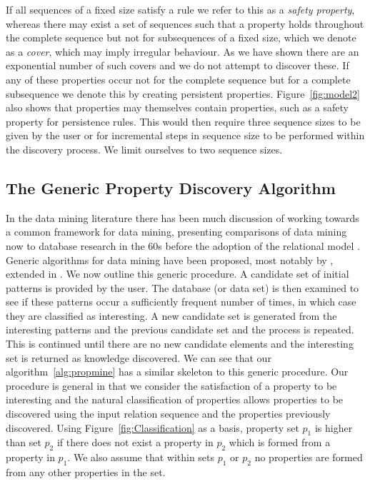 \medskip

If all sequences of a
fixed size satisfy a rule we refer to this as a {\em safety property},
whereas there may exist a set of sequences such that a property holds
throughout the complete sequence but not for subsequences of a fixed
size, which we denote as a {\em cover}, which may imply irregular
behaviour. As we have shown there are an exponential number of such
covers and we do not attempt to discover these. 
If any of these properties occur not for the complete sequence but for
a complete subsequence we
denote this by creating persistent 
properties. Figure~\ref{fig:model2} also shows that properties may themselves
contain properties, such as a safety property for persistence
rules. This would then require three sequence sizes to be given by the
user or for incremental steps in sequence size to be performed within
the discovery process. We limit ourselves to two sequence sizes.



\subsection{The Generic Property Discovery Algorithm}\label{subsec:tr_genalg}

In the data mining literature there has been much discussion of
working towards a common framework for data mining, presenting
comparisons of data mining now to database research in the 60s before
the adoption of the relational model \cite{fps96b,man96}. Generic algorithms for data
mining have been proposed, most notably by \cite{man96},
extended in \cite{man97}. We now outline this generic procedure. A
candidate set of initial patterns is provided by the user. The
database (or data set) is then examined to see if these patterns occur
a sufficiently frequent number of times, in which case they are
classified as interesting. A new candidate set is generated from the
interesting patterns and the previous candidate set and the process is
repeated. This is continued until there are no new candidate elements
and the interesting set is returned as knowledge discovered. We can
see that our algorithm~\ref{alg:propmine} has a similar skeleton to
this generic procedure. Our procedure is general in that we consider
the satisfaction of a property to be interesting and the natural
classification of properties allows properties to be discovered using
the input relation sequence and the properties previously discovered. 
Using Figure~\ref{fig:Classification} as a basis, property set $p_1$
is higher than set $p_2$ if there does not exist a property 
in $p_2$ which is formed from a property in $p_1$. We also assume that
within sets $p_1$ or $p_2$ no properties are formed from any other
properties in the set. 
 
